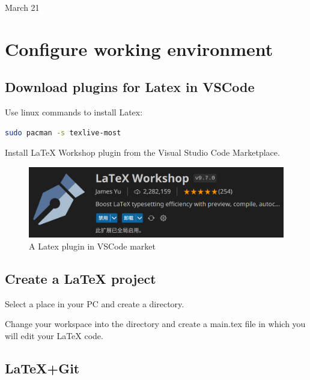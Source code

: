 

\univlogo

{\Huge March 21}\\[5mm]

\section*{Configure working environment}

\subsection*{Download plugins for Latex in VSCode}

Use linux commands to install Latex:

\begin{lstlisting}[language=bash]
    sudo pacman -s texlive-most
\end{lstlisting}

Install LaTeX Workshop plugin from the Visual Studio Code Marketplace.

\begin{figure}[h]
\centering
\includegraphics[width=1\textwidth]{./2023Mar/LaTeX-Workshop.png}
\caption{A Latex plugin in VSCode market}
\label{latexworkshop}
\end{figure}

\subsection*{Create a LaTeX project}

Select a place in your PC and create a directory.

Change your workspace into the directory and create a main.tex file in which you will edit your LaTeX code.

\subsection*{LaTeX+Git}

